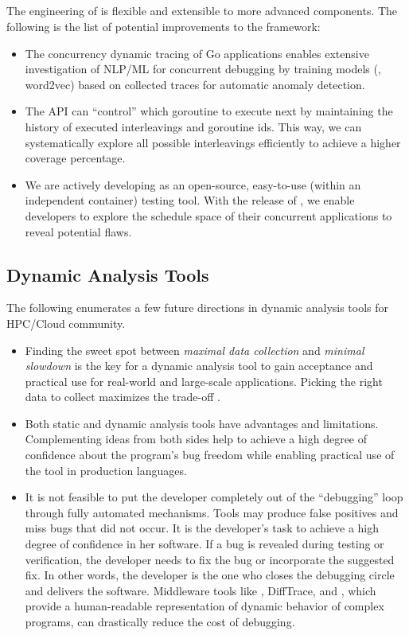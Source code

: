 \subsection{\goat}
The engineering of \goat is flexible and extensible to more advanced components. The following is the list of potential improvements to the framework:
\begin{itemize}
  \item The concurrency dynamic tracing of Go applications enables extensive investigation of NLP/ML for concurrent debugging by training models (\eg, word2vec) based on collected traces for automatic anomaly detection.
  \item The \goat API can ``control'' which goroutine to execute next by maintaining the history of executed interleavings and goroutine ids. This way, we can systematically explore all possible interleavings efficiently to achieve a higher coverage percentage.
  \item We are actively developing \goat as an open-source, easy-to-use (within an independent container) testing tool. With the release of \goat, we enable developers to explore the schedule space of their concurrent applications to reveal potential flaws.
\end{itemize}
\subsection{Dynamic Analysis Tools}
The following enumerates a few future directions in dynamic analysis tools for HPC/Cloud community.
\begin{itemize}
  \item Finding the sweet spot between \textit{maximal data collection} and \textit{minimal slowdown} is the key for a dynamic analysis tool to gain acceptance and practical use for real-world and large-scale applications. Picking the right data to collect maximizes the trade-off \cite{saeed-gpu-irregularKernels}\cite{mastersthesis}.
  \item Both static and dynamic analysis tools have advantages and limitations. Complementing ideas from both sides help to achieve a high degree of confidence about the program's bug freedom while enabling practical use of the tool in production languages.
  \item It is not feasible to put the developer completely out of the ``debugging'' loop through fully automated mechanisms. Tools may produce false positives and miss bugs that did not occur. It is the developer's task to achieve a high degree of confidence in her software. If a bug is revealed during testing or verification, the developer needs to fix the bug or incorporate the suggested fix. In other words, the developer is the one who closes the debugging circle and delivers the software. Middleware tools like \parlot, DiffTrace, and \goat, which provide a human-readable representation of dynamic behavior of complex programs, can drastically reduce the cost of debugging.
\end{itemize}
